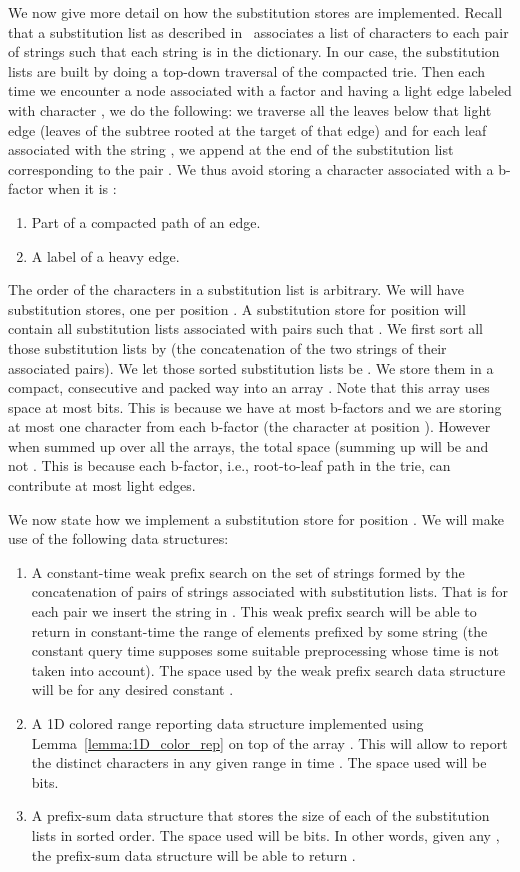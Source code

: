 \documentclass{article}
\newcommand{\?}{\mskip1.5mu}
\begin{document}
We now give more detail on how the substitution stores are implemented. Recall that a substitution list as described in~\cite{B09} associates a list of characters   to each pair of strings  such that each string  is in the dictionary. In our case, the substitution lists are built by doing a top-down traversal of the compacted trie. Then each time we encounter a node associated with a factor  and having a light edge labeled with character , we do the following: we traverse all the leaves below that light edge (leaves of the subtree rooted at the target of that edge) and for each leaf associated with the string , we append  at the end of the substitution list corresponding to the pair . 
We thus avoid storing a character associated with a b-factor when it is :
\begin{enumerate}
\item Part of a compacted path of an edge. 
\item A label of a heavy edge. 
\end{enumerate}
The order of the characters in a substitution list is arbitrary. We will have  substitution stores, one per position . 
A substitution store for position  will contain all substitution lists associated with pairs  such that . We first sort all those substitution lists by  (the concatenation of the two strings of their associated pairs). 
We let those sorted substitution lists be . We store them in a compact, consecutive and packed way into an array . Note that this array uses space at most  bits. This is because we have at most  b-factors and we are storing at most one character from each b-factor (the character at position ). However when summed up over all the arrays, the total space (summing up  will be  and not .
This is because each b-factor, i.e., root-to-leaf path in the trie, can contribute at most  light edges. 

We now state how we implement a substitution store for position . We will make use of the following data structures:
\begin{enumerate}
\item A constant-time weak prefix search on the set of strings  formed by the concatenation of pairs of strings associated with substitution lists. That is for each pair  we insert the string  in . This weak prefix search will be able to return in constant-time the range of elements  prefixed by some string  (the constant query time supposes some suitable preprocessing whose time is not taken into account). The space used by the weak prefix search data structure will be  for any desired constant . 
\item A 1D colored range reporting data structure implemented using Lemma~\ref{lemma:1D_color_rep} on top of the array . This will allow to report the  distinct characters in any given range  in time . The space used will be  bits. 
\item A prefix-sum data structure that stores the size of each of the substitution lists in sorted order. The space used will be  bits. In other words, given any , the prefix-sum data structure will be able to return . 
\end{enumerate}
\end{document}
